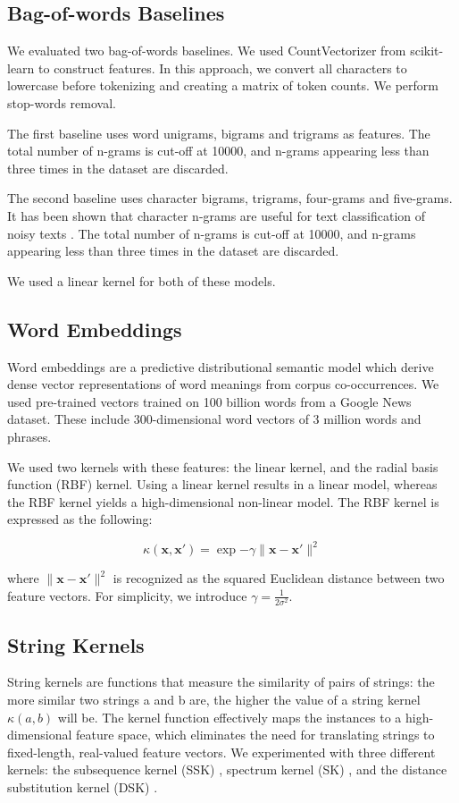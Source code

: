 \documentclass[final]{ieee}
\begin{document}
\subsection{Bag-of-words Baselines}
We evaluated two bag-of-words baselines. We used CountVectorizer from scikit-learn to construct features. In this approach, we convert all characters to lowercase before tokenizing and creating a matrix of token counts. We perform stop-words removal.

The first baseline uses word unigrams, bigrams and trigrams as features. The total number of n-grams is cut-off at 10000, and n-grams appearing less than three times in the dataset are discarded.

The second baseline uses character bigrams, trigrams, four-grams and five-grams. It has been shown that character n-grams are useful for text classification of noisy texts \citep{cavnar1994n}. The total number of n-grams is cut-off at 10000, and n-grams appearing less than three times in the dataset are discarded.

We used a linear kernel for both of these models.

\subsection{Word Embeddings}
Word embeddings \citep{mikolov2013distributed} are a predictive distributional semantic model which derive dense vector representations of word meanings from corpus co-occurrences. We used pre-trained vectors trained on 100 billion words from a Google News dataset. These include 300-dimensional word vectors of 3 million words and phrases.

We used two kernels with these features: the linear kernel, and the radial basis function (RBF) kernel. Using a linear kernel results in a linear model, whereas the RBF kernel yields a high-dimensional non-linear model. The RBF kernel is expressed as the following:

\[ \kappa(\mathbf{x}, \mathbf{x'}) = \exp{-\gamma \lVert \mathbf{x}-\mathbf{x'} \rVert ^2} \]

where $\lVert \mathbf{x}-\mathbf{x'} \rVert ^2$ is recognized as the squared Euclidean distance between two feature vectors. For simplicity, we introduce $\gamma = \frac{1}{2\sigma ^{2}}$.

\subsection{String Kernels}
String kernels are functions that measure the similarity of pairs of strings: the more similar two strings a and b are, the higher the value of a string kernel $\kappa(a, b)$ will be. The kernel function effectively maps the instances to a high-dimensional feature space, which eliminates the need for translating strings to fixed-length, real-valued feature vectors. We experimented with three different kernels: the subsequence kernel (SSK) \citep{lodhi2002text}, spectrum kernel (SK) \citep{leslie2002spectrum}, and the distance substitution kernel (DSK) \citep{haasdonk2004learning}.
\end{document}
